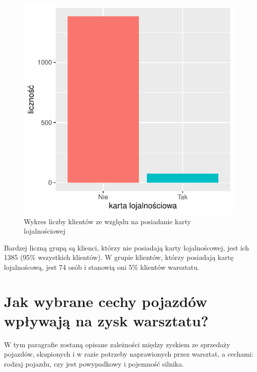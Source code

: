 \documentclass{article}\usepackage[]{graphicx}\usepackage[]{xcolor}
\makeatletter
\def\maxwidth{ %
  \ifdim\Gin@nat@width>\linewidth
    \linewidth
  \else
    \Gin@nat@width
  \fi
}
\newenvironment{knitrout}{}{} %
\makeatother
\begin{document}
\begin{knitrout}
\color{fgcolor}\begin{figure}[H]

{\centering \includegraphics[width=\maxwidth]{figure/fig_karta-1} 

}

\caption[Wykres liczby klientów ze względu na posiadanie karty lojalnościowej]{Wykres liczby klientów ze względu na posiadanie karty lojalnościowej}\label{fig:fig_karta}
\end{figure}

\end{knitrout}

Bardzej liczną grupą są klienci, którzy nie posiadają karty lojalnoścowej, jest ich 1385 (95\% wszystkich klientów). W grupie klientów, którzy posiadają kartę lojalnoścową, jest 74 osób i stanowią oni 5\% klientów warsztatu.

\section{Jak wybrane cechy pojazdów wpływają na zysk warsztatu?}

W tym paragrafie zostaną opisane zależności między zyskiem ze sprzedaży pojazdów, skupionych i w razie potrzeby naprawionych przez warsztat, a cechami: rodzaj pojazdu, czy jest powypadkowy i pojemność silnika.
\end{document}
